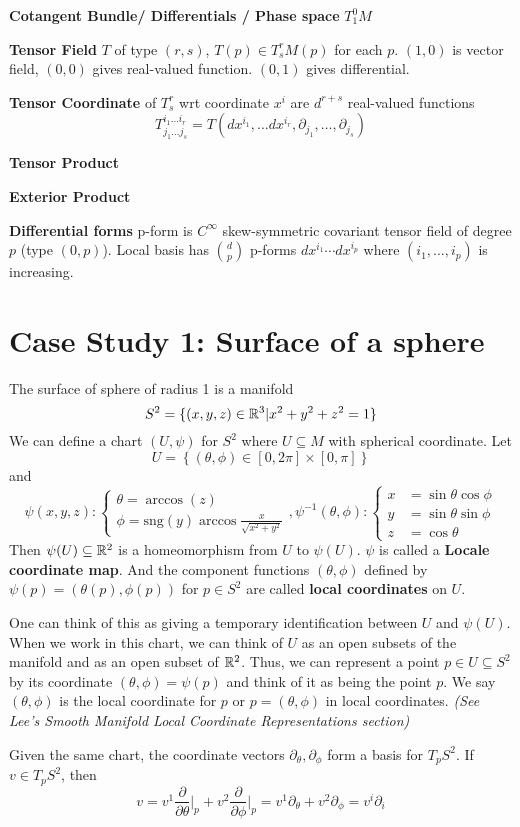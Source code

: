 \documentclass[12pt]{article}
\begin{document}
\textbf{Cotangent Bundle/ Differentials / Phase space} $T^0_1M$

\textbf{Tensor Field} $T$ of type $(r,s)$, $T(p) \in T^r_s M (p)$ for each $p$. $(1,0)$  is vector field, $(0,0)$ gives real-valued function. $(0, 1)$ gives differential.

\textbf{Tensor Coordinate} of $T^r_s$ wrt coordinate $x^i$ are $d^{r+s}$ real-valued functions $$T^{i_1\ldots i_r}_{j_1\ldots j_s} = T(dx^{i_1}, \ldots dx^{i_r}, \partial_{j_1}, \ldots , \partial_{j_s})$$

\textbf{Tensor Product}

\textbf{Exterior Product}

\textbf{Differential forms} p-form is $C^\infty$ skew-symmetric covariant tensor field of degree $p$ (type $(0,p)$). Local basis has ${d \choose p}$ p-forms $dx^{i_1}\cdots dx^{i_p}$ where $(i_1,\ldots,i_p)$ is increasing.

\onecolumn
\section{Case Study 1: Surface of a sphere}
The surface of sphere of radius 1 is a manifold $$S^2 = \{(x, y, z) \in \mathbb{R}^3 | x^2+y^2+z^2 = 1 \}$$
We can define a chart $(U, \psi)$ for $S^2$ where $U\subseteq M$ with spherical coordinate.  Let $$U = \left\{(\theta, \phi) \in [0, 2\pi]\times [0, \pi] \right\} $$
and $$
\psi(x,y,z): \begin{cases}
	\theta = \arccos(z) \\
	\phi = \text{sng}(y) \arccos \frac{x}{\sqrt{x^2 + y^2}}
\end{cases}, 
\psi^{-1}(\theta, \phi): 
\begin{cases}
	x &= \sin\theta \cos\phi \\
	y &= \sin\theta \sin\phi \\
	z &= \cos \theta
\end{cases} 
$$
Then $\psi(U) \subseteq \mathbb{R}^2$ is a homeomorphism from $U$ to $\psi(U)$. $\psi$ is called a \textbf{Locale coordinate map}. And the component functions $(\theta, \phi)$ defined by $\psi(p) = (\theta(p), \phi(p))$ for $p \in S^2$ are called \textbf{local coordinates} on $U$.

One can think of this as giving a temporary identification between $U$ and $\psi(U)$. When we work in this chart, we can think of $U$ as an open subsets of the manifold and as an open subset of $\mathbb{R}^2$. Thus, we can represent a point $p \in U \subseteq S^2$ by its coordinate $(\theta, \phi) = \psi(p)$ and think of it as being the point $p$. We say $(\theta, \phi)$ is the local coordinate for $p$ or $p = (\theta, \phi)$ in local coordinates. \textit{(See Lee's Smooth Manifold Local Coordinate Representations section)}

Given the same chart, the coordinate vectors $\partial_\theta, \partial_\phi$ form a basis for $T_pS^2$. If $v \in T_pS^2$, then  $$v = v^1 \frac{\partial}{\partial \theta}\bigg\rvert_p + v^2 \frac{\partial}{\partial \phi}\bigg\rvert_p = v^1\partial_\theta + v^2 \partial_\phi = v^i \partial_i $$
\end{document}

